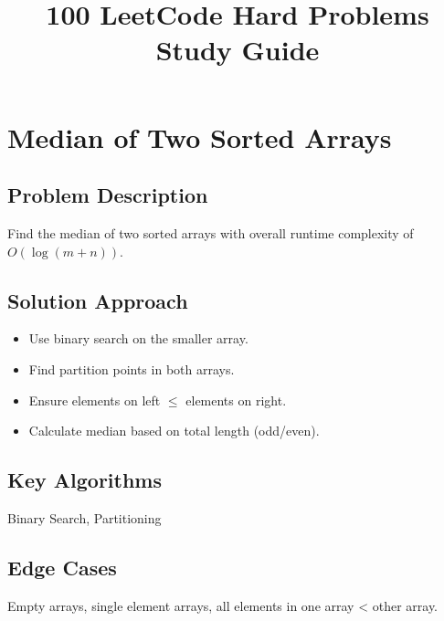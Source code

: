 \documentclass[10pt, a4paper]{article}
\title{100 LeetCode Hard Problems Study Guide}
\author{}
\date{}
\begin{document}
\maketitle
\tableofcontents
\newpage

\section{Median of Two Sorted Arrays}
\subsection*{Problem Description}
Find the median of two sorted arrays with overall runtime complexity of $O(\log(m+n))$.

\subsection*{Solution Approach}
\begin{itemize}
    \item Use binary search on the smaller array.
    \item Find partition points in both arrays.
    \item Ensure elements on left $\le$ elements on right.
    \item Calculate median based on total length (odd/even).
\end{itemize}

\subsection*{Key Algorithms}
Binary Search, Partitioning

\subsection*{Edge Cases}
Empty arrays, single element arrays, all elements in one array < other array.
\end{document}

